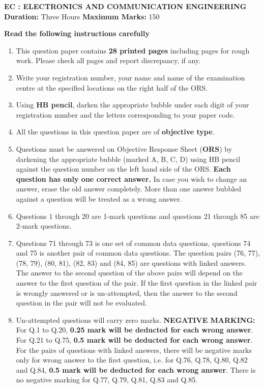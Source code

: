 \documentclass[12pt]{article}
\begin{document}
\begin{center}
    {\LARGE \textbf{EC : ELECTRONICS AND COMMUNICATION ENGINEERING}}\\[0.7em]
    \textbf{Duration:} Three Hours
    \hspace{2cm}
    \textbf{Maximum Marks:} 150
\end{center}

\vspace{1.5em}
\textbf{Read the following instructions carefully}
\begin{enumerate}[leftmargin=2em,itemsep=0.5em]
    \item This question paper contains \textbf{28 printed pages} including pages for rough work. Please check all pages and report discrepancy, if any.
    \item Write your registration number, your name and name of the examination centre at the specified locations on the right half of the ORS.
    \item Using \textbf{HB pencil}, darken the appropriate bubble under each digit of your registration number and the letters corresponding to your paper code.
    \item All the questions in this question paper are of \textbf{objective type}.
    \item Questions must be answered on Objective Response Sheet (\textbf{ORS}) by darkening the appropriate bubble (marked A, B, C, D) using HB pencil against the question number on the left hand side of the ORS. \textbf{Each question has only one correct answer.} In case you wish to change an answer, erase the old answer completely. More than one answer bubbled against a question will be treated as a wrong answer.
    \item Questions 1 through 20 are 1-mark questions and questions 21 through 85 are 2-mark questions.
    \item Questions 71 through 73 is one set of common data questions, questions 74 and 75 is another pair of common data questions. The question pairs (76, 77), (78, 79), (80, 81), (82, 83) and (84, 85) are questions with linked answers. The answer to the second question of the above pairs will depend on the answer to the first question of the pair. If the first question in the linked pair is wrongly answered or is un-attempted, then the answer to the second question in the pair will not be evaluated.
    \item Un-attempted questions will carry zero marks.
     \large \textbf {NEGATIVE MARKING:} For Q.1 to Q.20, \textbf{0.25 mark will be deducted for each wrong answer}. For Q.21 to Q.75, \textbf{0.5 mark will be deducted for each wrong answer}. For the pairs of questions with linked answers, there will be negative marks only for wrong answer to the first question, i.e. for Q.76, Q.78, Q.80, Q.82 and Q.84, \textbf{0.5 mark will be deducted for each wrong answer}. There is no negative marking for Q.77, Q.79, Q.81, Q.83 and Q.85.

\end{enumerate}
\end{document}
